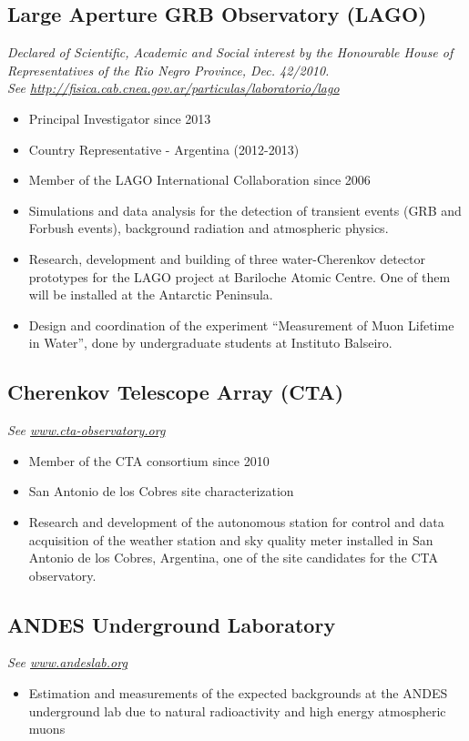 \subsection*{Large Aperture GRB Observatory (LAGO)}
{\emph{Declared of Scientific, Academic and Social interest by the Honourable
House of Representatives of the Rio Negro Province, Dec. 42/2010.}}\\
{\small{\textit{See
\href{http://fisica.cab.cnea.gov.ar/particulas/laboratorio/lago}
{http://fisica.cab.cnea.gov.ar/particulas/laboratorio/lago}}}}\\
\begin{itemize}
\item Principal Investigator since 2013
\item Country Representative - Argentina (2012-2013)
\item Member of the LAGO International Collaboration since 2006
\item Simulations and data analysis for the detection of transient events
(GRB and Forbush events), background radiation and atmospheric physics.
\item Research, development and building of three water-Cherenkov detector
prototypes for the LAGO project at Bariloche Atomic Centre. One of them will be
installed at the Antarctic Peninsula.
\item Design and coordination of the experiment ``Measurement of Muon Lifetime in
Water'', done by undergraduate students at Instituto Balseiro.
\end{itemize}

\subsection*{Cherenkov Telescope Array (CTA)}
{\small{\textit{See \href{http://www.cta-observatory.org}{www.cta-observatory.org}}}}
\begin{itemize}
\item Member of the CTA consortium since 2010
\item San Antonio de los Cobres site characterization
\item Research and development of the autonomous station for control and data
acquisition of the weather station and sky quality meter installed in San
Antonio de los Cobres, Argentina, one of the site candidates for the CTA
observatory.
\end{itemize}

\subsection*{ANDES Underground Laboratory}
{\small{\textit{See \href{http://www.andeslab.org}{www.andeslab.org}}}}
\begin{itemize}
\item Estimation and measurements of the expected backgrounds at the ANDES
underground lab due to natural radioactivity and high energy atmospheric muons
\end{itemize}

